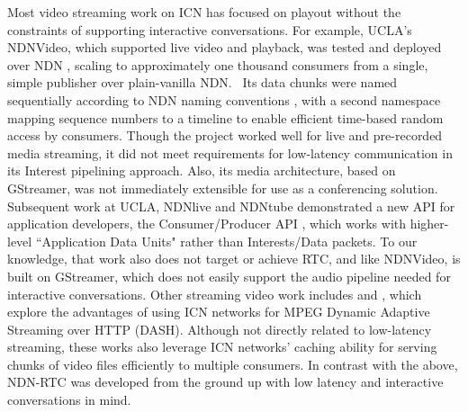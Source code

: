 \documentclass{icn/sig-alternate-2013} %
\newcommand{\ndnrtcName}{NDN-RTC} %
\begin{document}
Most video streaming work on ICN has focused on playout without the constraints of supporting interactive conversations.  For example, UCLA's NDNVideo, which supported live video and playback, was tested and deployed over NDN \cite{ndnvideo}, scaling to approximately one thousand consumers from a single, simple publisher over plain-vanilla NDN.~\cite{CrowleyNEAPresentation} Its data chunks were named sequentially according to NDN naming conventions \cite{ndnnaming}, with a second namespace mapping sequence numbers to a timeline to enable efficient time-based random access by consumers. Though the project worked well for live and pre-recorded media streaming, it did not meet requirements for low-latency communication in its Interest pipelining approach. Also, its media architecture, based on GStreamer, was not immediately extensible for use as a conferencing solution. Subsequent work at UCLA, NDNlive and NDNtube \cite{ndnlive-tube} demonstrated a new API for application developers, the Consumer/Producer API \cite{cons-prod-api}, which works with higher-level ``Application Data Units" rather than Interests/Data packets.  To our knowledge, that work also does not target or achieve RTC, and like NDNVideo, is built on GStreamer, which does not easily support the audio pipeline needed for interactive conversations. %
Other streaming video work includes \cite{ccn-dash} and \cite{ndn-dash}, which explore the advantages of using ICN networks for MPEG Dynamic Adaptive Streaming over HTTP (DASH). Although not directly related to low-latency streaming, these works also leverage ICN networks' caching ability for serving chunks of video files efficiently to multiple consumers.
In contrast with the above, \ndnrtcName{} was developed from the ground up with low     latency and interactive conversations in mind. %
\end{document}
